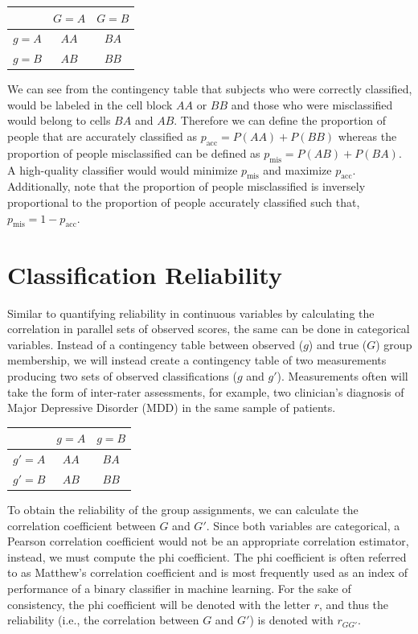 \documentclass[
  letterpaper,
  DIV=11,
  numbers=noendperiod]{scrreprt}
\begin{document}
\begin{longtable}[]{@{}lcc@{}}
\toprule\noalign{}
& \(G=A\) & \(G=B\) \\
\midrule\noalign{}
\endhead
\bottomrule\noalign{}
\endlastfoot
\(g=A\) & \(AA\) & \(BA\) \\
\(g=B\) & \(AB\) & \(BB\) \\
\end{longtable}

We can see from the contingency table that subjects who were correctly
classified, would be labeled in the cell block \(AA\) or \(BB\) and
those who were misclassified would belong to cells \(BA\) and \(AB\).
Therefore we can define the proportion of people that are accurately
classified as \(p_{\text{acc}} = P(AA) + P(BB)\) whereas the proportion
of people misclassified can be defined as
\(p_{\text{mis}} = P(AB)+ P(BA)\). A high-quality classifier would would
minimize \(p_{\text{mis}}\) and maximize \(p_{\text{acc}}\).
Additionally, note that the proportion of people misclassified is
inversely proportional to the proportion of people accurately classified
such that, \(p_{\text{mis}} = 1-p_{\text{acc}}\).

\hypertarget{classification-reliability}{%
\section{Classification Reliability}\label{classification-reliability}}

Similar to quantifying reliability in continuous variables by
calculating the correlation in parallel sets of observed scores, the
same can be done in categorical variables. Instead of a contingency
table between observed (\(g\)) and true (\(G\)) group membership, we
will instead create a contingency table of two measurements producing
two sets of observed classifications (\(g\) and \(g'\)). Measurements
often will take the form of inter-rater assessments, for example, two
clinician's diagnosis of Major Depressive Disorder (MDD) in the same
sample of patients.

\begin{longtable}[]{@{}ccc@{}}
\toprule\noalign{}
& \(g=A\) & \(g=B\) \\
\midrule\noalign{}
\endhead
\bottomrule\noalign{}
\endlastfoot
\(g'=A\) & \(AA\) & \(BA\) \\
\(g'=B\) & \(AB\) & \(BB\) \\
\end{longtable}

To obtain the reliability of the group assignments, we can calculate the
correlation coefficient between \(G\) and \(G'\). Since both variables
are categorical, a Pearson correlation coefficient would not be an
appropriate correlation estimator, instead, we must compute the phi
coefficient. The phi coefficient is often referred to as Matthew's
correlation coefficient and is most frequently used as an index of
performance of a binary classifier in machine learning. For the sake of
consistency, the phi coefficient will be denoted with the letter \(r\),
and thus the reliability (i.e., the correlation between \(G\) and
\(G'\)) is denoted with \(r_{GG'}\).
\end{document}
